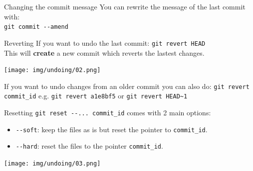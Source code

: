\documentclass[usenames,dvipsnames,9pt]{beamer}
\begin{document}
%
\begin{frame}{Changing the commit message}
  You can rewrite the message of the last commit with:\\
  \lstinline|git commit --amend|

  \vspace{0.5cm}
\end{frame}

%
\begin{frame}{Reverting}
  If you want to undo the last commit: \lstinline|git revert HEAD|\\
  This will \textbf{create} a new commit which reverts the lastest changes.

  \vspace{0.5cm}
  \texttt{[image: img/undoing/02.png]}

  If you want to undo changes from an older commit you can also do:
  \lstinline|git revert commit_id| e.g. \lstinline|git revert a1e8bf5| or \lstinline|git revert HEAD~1|
\end{frame}

%
\begin{frame}{Resetting}
  \lstinline|git reset --... commit_id| comes with 2 main options:
  \begin{itemize}
    \item \lstinline|--soft|: keep the files as is but reset the pointer to \lstinline|commit_id|.
    \item \lstinline|--hard|: reset the files to the pointer \lstinline|commit_id|.
  \end{itemize}

  \vspace{0.5cm}
  \texttt{[image: img/undoing/03.png]}
\end{frame}
\end{document}
